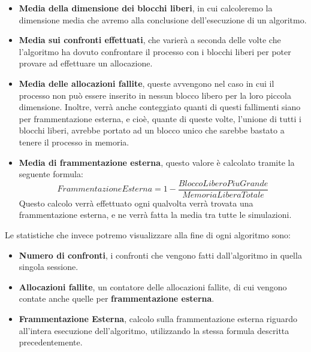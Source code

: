 \documentclass[20pt,a4paper,oneside]{article}
\begin{document}
\begin{itemize}

\item \textbf{Media della dimensione dei blocchi liberi}, in cui calcoleremo la dimensione media che avremo alla conclusione dell'esecuzione di un algoritmo.
\item \textbf{Media sui confronti effettuati}, che varierà a seconda delle volte che l'algoritmo ha dovuto confrontare il processo con i blocchi liberi per poter provare ad effettuare un allocazione.
\item \textbf{Media delle allocazioni fallite}, queste avvengono nel caso in cui il processo non può essere inserito in nessun blocco libero per la loro piccola dimensione. Inoltre, verrà anche conteggiato quanti di questi fallimenti siano per frammentazione esterna, e cioè, quante di queste volte, l'unione di tutti i blocchi liberi, avrebbe portato ad un blocco unico che sarebbe bastato a tenere il processo in memoria.
\item \textbf{Media di frammentazione esterna}, questo valore è calcolato tramite la seguente formula: 
\begin{equation*}
Frammentazione Esterna = 1 - \frac{Blocco Libero Piu Grande}{Memoria Libera Totale}
\end{equation*}
Questo calcolo verrà effettuato ogni qualvolta verrà trovata una frammentazione esterna, e ne verrà fatta la media tra tutte le simulazioni.

\end{itemize}

Le statistiche che invece potremo visualizzare alla fine di ogni algoritmo sono:

\begin{itemize}
\item \textbf{Numero di confronti}, i confronti che vengono fatti dall'algoritmo in quella singola sessione.
\item \textbf{Allocazioni fallite}, un contatore delle allocazioni fallite, di cui vengono contate anche quelle per \textbf{frammentazione esterna}.
\item \textbf{Frammentazione Esterna}, calcolo sulla frammentazione esterna riguardo all'intera esecuzione dell'algoritmo, utilizzando la stessa formula descritta precedentemente.
\end{itemize}

\newpage
\end{document}
